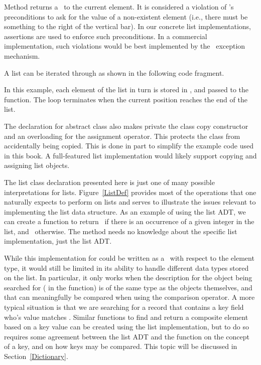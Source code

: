 Method  returns a \pointref\ to the current element.
It is considered a violation of 's preconditions to ask
for the value of a non-existent element
(i.e., there must be something to the right of the vertical bar).
In our concrete list implementations, assertions are
used to enforce such preconditions.
In a commercial implementation, such violations would be best
implemented by the \Lang\ exception mechanism.

A list can be iterated through as shown
in the following code fragment.


\noindent In this example, each element of the list in turn is stored
in , and passed to the  function.
The loop terminates when the current position reaches the end of the
list.

{The declaration for abstract class  also makes private the
class copy constructor and an overloading for the assignment operator.
This protects the class from accidentally being copied.
This is done in part to simplify the example code used in this book.
A full-featured list implementation would likely support copying and
assigning list objects.}{}

The list class declaration presented here is just one of
many possible interpretations for lists.
Figure~\ref{ListDef} provides most of the operations that one
naturally expects to perform on lists and serves to illustrate the
issues relevant to implementing the list data structure.
As an example of using the list ADT, we can create a function to
return \TRUE\ if there is an occurrence of a given integer in the
list, and \FALSE\ otherwise.
The  method needs no knowledge about the specific list
implementation, just the list ADT.


While this implementation for  could be written as a
\Gen\ with respect to the element type, it would still be
limited in its ability to handle different data types stored on the
list.
In particular, it only works when the description for the object being
searched for ( in the function) is of the same type as the
objects themselves,
and that can meaningfully be compared when using the \Cref{==}
comparison operator.
A more typical situation is that we are searching for a record that
contains a key field who's value matches .
Similar functions to find and return a composite element based on a
key value can be created using the list implementation, but to do so
requires some agreement between the list ADT and the 
function on the concept of a key, and on how keys may be compared.
This topic will be discussed in Section~\ref{Dictionary}.

